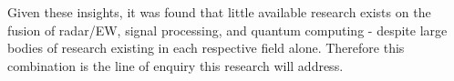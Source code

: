 Given these insights, it was found that little available research exists on the fusion of radar/\ac{EW}, signal processing, and quantum computing - despite large bodies of research existing in each respective field alone.
Therefore this combination is the line of enquiry this research will address.


